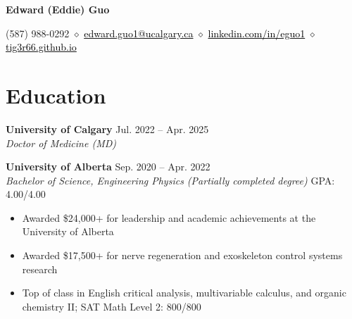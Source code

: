 \documentclass{article}
\begin{document}
\thispagestyle{plain}
\begin{center}
\LARGE \textbf{\textcolor{my_colour}{Edward (Eddie) Guo}} \vspace{.2em}

\normalfont \normalsize
(587) 988-0292
    \hspace{.15em} $\diamond$ \hspace{.15em}
\href{mailto:edward.guo1@ucalgary.ca}{\textcolor{black}{edward.guo1@ucalgary.ca}}
    \hspace{.15em} $\diamond$ \hspace{.15em}
\href{https://www.linkedin.com/in/eguo1}{\textcolor{black}{linkedin.com/in/eguo1}}
    \hspace{.15em} $\diamond$ \hspace{.15em}
\href{https://tig3r66.github.io/index.html}{\textcolor{black}{tig3r66.github.io}}
\end{center}

\vspace{-1em}


\section*{\textcolor{my_colour}{Education}}
\vspace{-.25em} \hrulefill \vspace{.25em}

\textbf{University of Calgary} \hfill Jul. 2022 -- Apr. 2025 \\
\textit{Doctor of Medicine (MD)} \vspace{1em}

\textbf{University of Alberta} \hfill Sep. 2020 -- Apr. 2022 \\
\textit{Bachelor of Science, Engineering Physics (Partially completed degree)} \hfill GPA: 4.00/4.00
\begin{itemize}
    \item Awarded \$24,000+ for leadership and academic achievements at the University of Alberta
    \item Awarded \$17,500+ for nerve regeneration and exoskeleton control systems research
    \item Top of class in English critical analysis, multivariable calculus, and organic chemistry II; SAT Math Level 2: 800/800
\end{itemize} \vspace{1em}
\end{document}
